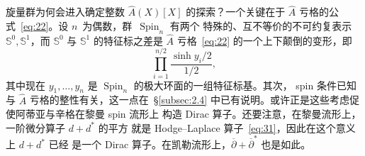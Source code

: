 \documentclass[11pt]{amsart}
\theoremstyle{definition}
\theoremstyle{remark}
\theoremstyle{plain}
\numberwithin{equation}{section}
\renewcommand{\:}{\colon}
\newcommand{\Ahat}{{\hat A}}
\DeclareMathOperator{\Spin}{Spin}
\newcommand{\ZZ}{{\mathbb Z}}
\newcommand{\dbar}{{\overline\partial}}
\renewcommand{\SS}{\mathbb{S}}
\begin{document}

旋量群为何会进入确定整数 $\Ahat(X)[X]$ 的探索？一个关键在于
$\Ahat$ 亏格的公式~\eqref{eq:22}。设 $n$~为偶数，群~$\Spin_n$ 有两个
特殊的、互不等价的不可约复表示~$\SS^0,\SS^1$，而 $\SS^0$ 与 $\SS^1$
的特征标之差是 $\Ahat$ 亏格~\eqref{eq:22} 的一个上下颠倒的变形，即
  \begin{equation}\label{eq:40}
     \prod\limits_{i=1}^{n/2}\frac{\sinh y_i/2}{1/2}, 
  \end{equation}
其中现在 $y_1,\dots ,y_n$ 是 $\Spin_n$ 的极大环面的一组特征标基。其次，
spin 条件已知与 $\Ahat$ 亏格的整性有关，这一点在~\S\ref{subsec:2.4}
中已有说明。或许正是这些考虑促使阿蒂亚与辛格在黎曼 spin 流形上
构造 Dirac 算子。还要注意，在黎曼流形上，一阶微分算子 $d+d^*$ 的平方
就是 Hodge–Laplace 算子~\eqref{eq:31}，因此在这个意义上 $d+d^*$ 已经
是一个 Dirac 算子。在凯勒流形上，$\dbar + \dbar^*$ 也是如此。
\end{document}
